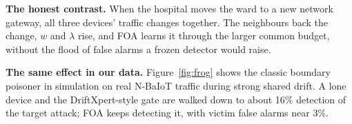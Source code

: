 \textbf{The honest contrast.} When the hospital moves the ward to a new network gateway, all three
devices' traffic changes together. The neighbours back the change, $w$ and $\lambda$ rise, and FOA
learns it through the larger common budget, without the flood of false alarms a frozen detector would
raise.

\textbf{The same effect in our data.} Figure~\ref{fig:frog} shows the classic boundary poisoner in
simulation on real N-BaIoT traffic during strong shared drift. A lone device and the DriftXpert-style
gate are walked down to about 16\% detection of the target attack; FOA keeps detecting it, with victim
false alarms near 3\%.
